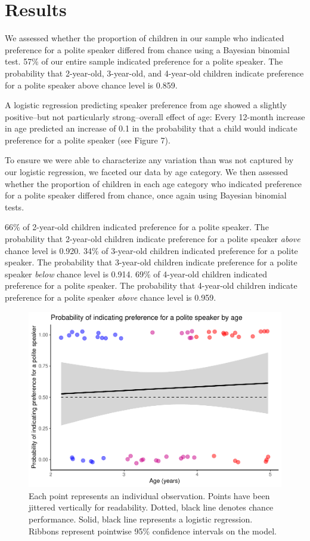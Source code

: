\documentclass[
  english,
  man,floatsintext]{apa6}
\begin{document}
\hypertarget{results}{%
\section{Results}\label{results}}

We assessed whether the proportion of children in our sample who indicated preference for a polite speaker differed from chance using a Bayesian binomial test. 57\% of our entire sample indicated preference for a polite speaker. The probability that 2-year-old, 3-year-old, and 4-year-old children indicate preference for a polite speaker above chance level is 0.859.

A logistic regression predicting speaker preference from age showed a slightly positive--but not particularly strong--overall effect of age: Every 12-month increase in age predicted an increase of 0.1 in the probability that a child would indicate preference for a polite speaker (see Figure 7).

To ensure we were able to characterize any variation than was not captured by our logistic regression, we faceted our data by age category. We then assessed whether the proportion of children in each age category who indicated preference for a polite speaker differed from chance, once again using Bayesian binomial tests.

66\% of 2-year-old children indicated preference for a polite speaker. The probability that 2-year-old children indicate preference for a polite speaker \emph{above} chance level is 0.920. 34\% of 3-year-old children indicated preference for a polite speaker. The probability that 3-year-old children indicate preference for a polite speaker \emph{below} chance level is 0.914. 69\% of 4-year-old children indicated preference for a polite speaker. The probability that 4-year-old children indicate preference for a polite speaker \emph{above} chance level is 0.959.

\begin{figure}
\centering
\includegraphics{writeup_files/figure-latex/unnamed-chunk-1-1.pdf}
\caption{\label{fig:unnamed-chunk-1}Each point represents an individual observation. Points have been jittered vertically for readability. Dotted, black line denotes chance performance. Solid, black line represents a logistic regression. Ribbons represent pointwise 95\% confidence intervals on the model.}
\end{figure}
\end{document}
